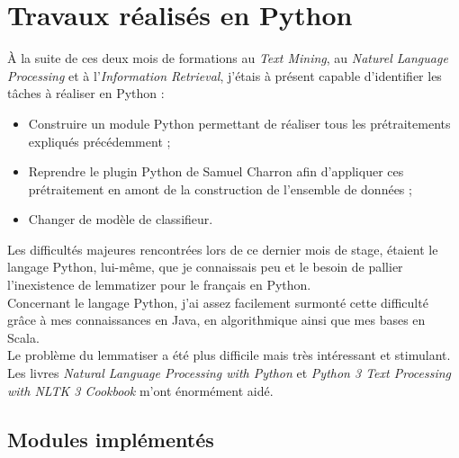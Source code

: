 \section{Travaux réalisés en Python}
\label{sec:travaux_python}
    À la suite de ces deux mois de formations au \textit{Text Mining}, au \textit{Naturel Language Processing} et à l'\textit{Information Retrieval}, j'étais à présent capable d'identifier les tâches à réaliser en Python :
    \begin{itemize}
        \item Construire un module Python permettant de réaliser tous les prétraitements expliqués précédemment ;
        \item Reprendre le plugin Python de Samuel Charron afin d'appliquer ces prétraitement en amont de la construction de l'ensemble de données ;
        \item Changer de modèle de classifieur.\\
    \end{itemize}

    Les difficultés majeures rencontrées lors de ce dernier mois de stage, étaient le langage Python, lui-même, que je connaissais peu et le besoin de pallier l'inexistence de lemmatizer pour le français en Python.\\
    Concernant le langage Python, j'ai assez facilement surmonté cette difficulté grâce à mes connaissances en Java, en algorithmique ainsi que mes bases en Scala.\\
    Le problème du lemmatiser a été plus difficile mais très intéressant et stimulant.\\
    Les livres \textit{Natural Language Processing with Python}\autocite{nlp_p} et \textit{Python 3 Text Processing with NLTK 3 Cookbook}\autocite{nltk} m'ont énormément aidé.

    \subsection{Modules implémentés}
